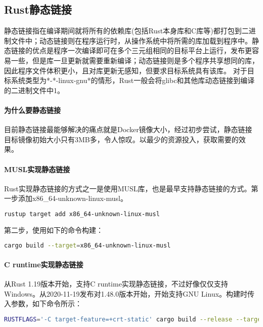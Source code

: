 \documentclass[../../../dolphin-book-2023.tex]{subfiles}
\begin{document}
\subsection{Rust静态链接}

静态链接指在编译期间就将所有的依赖库(包括Rust本身库和C库等)都打包到二进制文件中；动态链接则在程序运行时，从操作系统中将所需的库加载到程序中。静态链接的优点是程序一次编译即可在多个三元组相同的目标平台上运行，发布更容易一些，但是库一旦更新就需要重新编译；动态链接则是多个程序共享想同的库，因此程序文件体积更小，且对库更新无感知，但要求目标系统具有该库。 对于目标系统类型为*-*-linux-gnu*的情形，Rust一般会将glibc和其他库动态链接到编译的二进制文件中1。

\paragraph{为什么要静态链接}

目前静态链接最能够解决的痛点就是Docker镜像大小，经过初步尝试，静态链接目标镜像初始大小只有3MB多，令人惊叹。以最少的资源投入，获取需要的效果。

\paragraph{MUSL实现静态链接}

Rust实现静态链接的方式之一是使用MUSL库，也是最早支持静态链接的方式。第一步添加x86\_64-unknown-linux-musl。

\begin{lstlisting}[language=Bash]
rustup target add x86_64-unknown-linux-musl
\end{lstlisting}

第二步，使用如下的命令构建：

\begin{lstlisting}[language=Bash]
cargo build --target=x86_64-unknown-linux-musl
\end{lstlisting}

\paragraph{C runtime实现静态链接}

从Rust 1.19版本开始，支持C runtime实现静态链接，不过好像仅仅支持Windows。从2020-11-19发布对1.48.0版本开始，开始支持GNU Linux。构建时传入参数，如下命令所示：

\begin{lstlisting}[language=Bash]
RUSTFLAGS='-C target-feature=+crt-static' cargo build --release --target x86_64-unknown-linux-gnu
\end{lstlisting}
\end{document}
